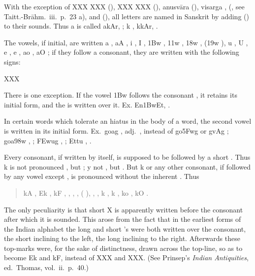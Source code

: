 \s With the exception of  XXX XXX (),  XXX XXX (), anusvāra
{\dn {\rs -\re}\2}  (), visarga {\dn ,}  (,
see Taitt.-Brāhm.\ iii.\ p.\ 23 a), and  (),
all letters are named in Sanskrit by adding  () to
their sounds. Thus {\dn a}  is called {\dn akAr,} ; {\dn k}
, {\dn kkAr,} .

\s The vowels, if initial, are written {\dn a} , {\dn aA} , {\dn i}
, {\dn I} , {\dn \31Bw} , {\dn \311w} , {\dn \318w} ,
({\dn \319w} ), {\dn u} , {\dn U} , {\dn e} , {\dn e\?}
, {\dn ao} , {\dn aO} ; if they follow a consonant, they are
written with the following signs:

XXX

There is one exception. If the vowel {\dn \31Bw}  follows the consonant
{\dn {}} , it retains its initial form, and the  is written over
it. Ex. {\dn En\31Bw\0Et,} .

In certain words which tolerate an hiatus in the body of a word, the
second vowel is written in its initial form. Ex.\ {\dn go{}ag\5}
, adj.\ , instead of {\dn go\35Fwg\5}
 or {\dn gvAg\5} ; {\dn goa\398w\2} ,
; {\dn \3FEw{}ug} , ; {\dn Ett{}u}
, .

\s Every consonant, if written by itself, is supposed to be followed by
a short . Thus {\dn k} is not pronounced , but ; {\dn y}
not , but . But {\dn k}  or any other consonant, if
followed by any vowel except , is pronounced without the inherent
. Thus

\begin{quote}
  {\dn kA} , {\dn Ek} , {\dn kF} , {\dn {}} , {\dn {}}
  , {\dn {}} , ({\dn {}} ), {\dn {}} ,
  {\dn {}} , {\dn k\?} , {\dn k\4} , {\dn ko} , {\dn kO}
  .
\end{quote}

The only peculiarity is that short X  is apparently written before
the consonant after which it is sounded. This arose from the fact that
in the earliest forms of the Indian alphabet the long and short 's
were both written over the consonant, the short  inclining to the
left, the long  inclining to the right. Afterwards these top-marks
were, for the sake of distinctness, drawn across the top-line, so as to
become {\dn Ek} and {\dn kF}, instead of XXX and XXX. (See Prinsep's
\emph{Indian Antiquities}, ed.\ Thomas, vol.\ ii.\ p.\ 40.)

